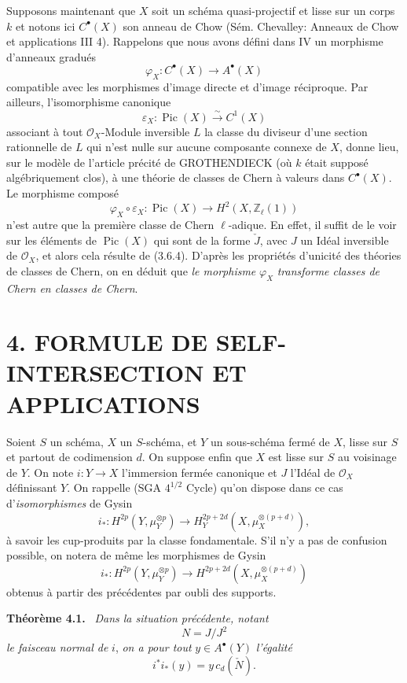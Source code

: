\documentclass[11pt]{article}
\newenvironment{statement}[1]{\par\medskip\noindent\textbf{#1.}\ }{\par\medskip}
\providecommand{\Pic}{\operatorname{Pic}}
\begin{document}
Supposons maintenant que $X$ soit un schéma quasi-projectif et lisse sur un corps $k$ et notons ici $C^{\bullet}(X)$ son anneau de Chow (Sém. Chevalley: Anneaux de Chow et applications III 4). Rappelons que nous avons défini dans IV un morphisme d'anneaux gradués
\[
\varphi_X:C^{\bullet}(X)\to A^{\bullet}(X)
\]
compatible avec les morphismes d'image directe et d'image réciproque. Par ailleurs, l'isomorphisme canonique
\[
\varepsilon_X:\Pic(X)\xrightarrow{\sim} C^1(X)
\]
associant à tout $\mathcal O_X$-Module inversible $L$ la classe du diviseur d'une section rationnelle de $L$ qui n'est nulle sur aucune composante connexe de $X$, donne lieu, sur le modèle de l'article précité de GROTHENDIECK (où $k$ était supposé algébriquement clos), à une théorie de classes de Chern à valeurs dans $C^{\bullet}(X)$. Le morphisme composé
\[
\varphi_X\circ\varepsilon_X:\Pic(X)\longrightarrow H^2(X,\mathbb Z_\ell(1))
\]
n'est autre que la première classe de Chern $\ell$-adique. En effet, il suffit de le voir sur les éléments de $\Pic(X)$ qui sont de la forme $\check J$, avec $J$ un Idéal inversible de $\mathcal O_X$, et alors cela résulte de (3.6.4). D'après les propriétés d'unicité des théories de classes de Chern, on en déduit que \emph{le morphisme} $\varphi_X$ \emph{transforme classes de Chern en classes de Chern}.

\section*{4. FORMULE DE SELF-INTERSECTION ET APPLICATIONS}

Soient $S$ un schéma, $X$ un $S$-schéma, et $Y$ un sous-schéma fermé de $X$, lisse sur $S$ et partout de codimension $d$. On suppose enfin que $X$ est lisse sur $S$ au voisinage de $Y$. On note $i:Y\to X$ l'immersion fermée canonique et $J$ l'Idéal de $\mathcal O_X$ définissant $Y$. On rappelle (SGA $4^{1/2}$ Cycle) qu'on dispose dans ce cas d'\emph{isomorphismes} de Gysin
\[
i_*:H^{2p}(Y,\mu_Y^{\otimes p})
\to H_Y^{2p+2d}(X,\mu_X^{\otimes(p+d)}),
\]
à savoir les cup-produits par la classe fondamentale. S'il n'y a pas de confusion possible, on notera de même les morphismes de Gysin
\[
i_*:H^{2p}(Y,\mu_Y^{\otimes p})
\to H^{2p+2d}(X,\mu_X^{\otimes(p+d)})
\]
obtenus à partir des précédentes par oubli des supports.

\begin{statement}{Théorème 4.1}
\emph{Dans la situation précédente, notant}
\[
N=J/J^2
\]
\emph{le faisceau normal de} $i$, \emph{on a pour tout} $y\in A^{\bullet}(Y)$ \emph{l'égalité}
\[
i^*i_*(y)=y\,c_d(\check N).
\]
\end{statement}
\end{document}
